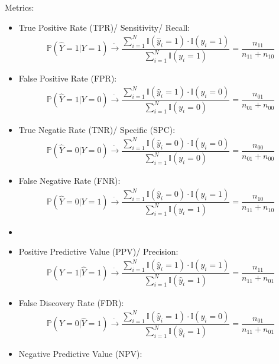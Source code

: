 Metrics:
\begin{itemize}[topsep=2pt,itemsep=0pt]
    \item True Positive Rate (TPR)/ Sensitivity/ Recall:
    \begin{align}
        \mathbb{P}\left( \hat{Y}=1|Y=1 \right)\xrightarrow[]{\hat{ }}\dfrac{\sum_{i=1}^N\mathbb{I}(\hat{y}_i=1)\cdot\mathbb{I}(y_i=1)}{\sum_{i=1}^N\mathbb{I}(y_i=1)} =\dfrac{n_{11}}{n_{11}+n_{10}}
    \end{align}
    \item False Positive Rate (FPR):
    \begin{align}
        \mathbb{P}\left( \hat{Y}=1|Y=0 \right)\xrightarrow[]{\hat{ }}\dfrac{\sum_{i=1}^N\mathbb{I}(\hat{y}_i=1)\cdot\mathbb{I}(y_i=0)}{\sum_{i=1}^N\mathbb{I}(y_i=0)} =\dfrac{n_{01}}{n_{01}+n_{00}}
    \end{align}
    \item True Negatie Rate (TNR)/ Specific (SPC):
    \begin{align}
        \mathbb{P}\left( \hat{Y}=0|Y=0 \right)\xrightarrow[]{\hat{ }}\dfrac{\sum_{i=1}^N\mathbb{I}(\hat{y}_i=0)\cdot\mathbb{I}(y_i=0)}{\sum_{i=1}^N\mathbb{I}(y_i=0)} =\dfrac{n_{00}}{n_{01}+n_{00}} 
    \end{align}
    \item False Negative Rate (FNR):
    \begin{align}
        \mathbb{P}\left( \hat{Y}=0|Y=1 \right)\xrightarrow[]{\hat{ }}\dfrac{\sum_{i=1}^N\mathbb{I}(\hat{y}_i=0)\cdot\mathbb{I}(y_i=1)}{\sum_{i=1}^N\mathbb{I}(y_i=1)} =\dfrac{n_{10}}{n_{11}+n_{10}}
    \end{align}
    \item 
    \item Positive Predictive Value (PPV)/ Precision:
    \begin{align}
        \mathbb{P}\left( Y=1|\hat{Y}=1 \right)\xrightarrow[]{\hat{ }}\dfrac{\sum_{i=1}^N\mathbb{I}(\hat{y}_i=1)\cdot\mathbb{I}(y_i=1)}{\sum_{i=1}^N\mathbb{I}(\hat{y}_i=1)} =\dfrac{n_{11}}{n_{11}+n_{01}} 
    \end{align}
    \item False Discovery Rate (FDR):
    \begin{align}
        \mathbb{P}\left( Y=0|\hat{Y}=1 \right)\xrightarrow[]{\hat{ }}\dfrac{\sum_{i=1}^N\mathbb{I}(\hat{y}_i=1)\cdot\mathbb{I}(y_i=0)}{\sum_{i=1}^N\mathbb{I}(\hat{y}_i=1)} =\dfrac{n_{01}}{n_{11}+n_{01}} 
    \end{align}
    \item Negative Predictive Value (NPV):

\end{itemize}
